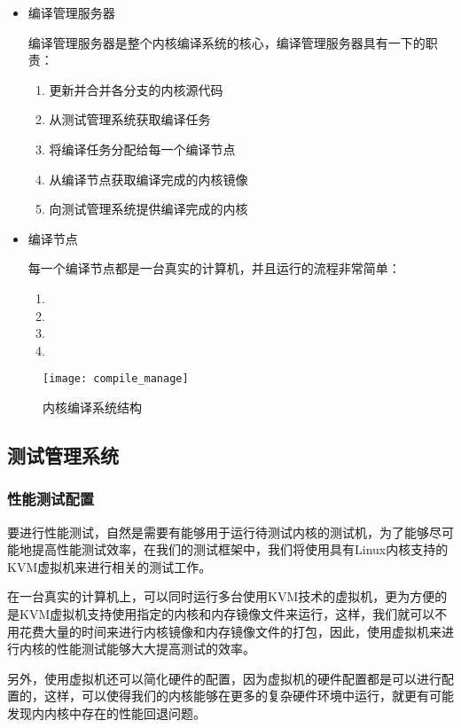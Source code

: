 \begin{itemize}
\item 编译管理服务器

编译管理服务器是整个内核编译系统的核心，编译管理服务器具有一下的职责：

\begin{enumerate}
\item 更新并合并各分支的内核源代码
\item 从测试管理系统获取编译任务
\item 将编译任务分配给每一个编译节点
\item 从编译节点获取编译完成的内核镜像
\item 向测试管理系统提供编译完成的内核
\end{enumerate}

\item 编译节点

每一个编译节点都是一台真实的计算机，并且运行的流程非常简单：
\begin{enumerate}
\item 
\item
\item
\item
\end{enumerate}

\end{itemize}

\begin{figure}[H]
\centering
\texttt{[image: compile\_manage]}
\caption{内核编译系统结构}
\label{fig:compile_manage}
\end{figure}

\subsection{测试管理系统}
\subsubsection{性能测试配置}
要进行性能测试，自然是需要有能够用于运行待测试内核的测试机，为了能够尽可能地提高性能测试效率，在我们的测试框架中，我们将使用具有Linux内核支持的KVM虚拟机来进行相关的测试工作。

在一台真实的计算机上，可以同时运行多台使用KVM技术的虚拟机，更为方便的是KVM虚拟机支持使用指定的内核和内存镜像文件来运行，这样，我们就可以不用花费大量的时间来进行内核镜像和内存镜像文件的打包，因此，使用虚拟机来进行内核的性能测试能够大大提高测试的效率。

另外，使用虚拟机还可以简化硬件的配置，因为虚拟机的硬件配置都是可以进行配置的，这样，可以使得我们的内核能够在更多的复杂硬件环境中运行，就更有可能发现内内核中存在的性能回退问题。

